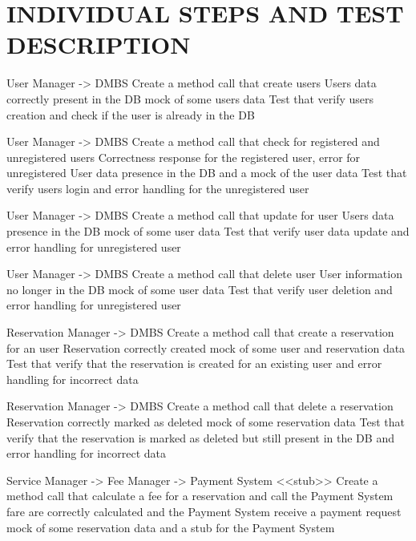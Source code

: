 \section{INDIVIDUAL STEPS AND TEST DESCRIPTION}

\teststep 
{User Manager -> DMBS}
{Create a method call that create users }
{Users data correctly present in the DB}
{mock of some users data }
{Test that verify users creation and check if the user is already in the DB}

\teststep 
{User Manager -> DMBS}
{Create a method call that check for registered and unregistered users}
{Correctness response for the registered user, error for unregistered}
{User data presence in the DB and a mock of  the user data }
{Test that verify users login and error handling for the unregistered user}

\teststep 
{User Manager -> DMBS}
{Create a method call that update for user }
{Users data presence in the DB}
{mock of some user data }
{Test that verify user data update and error handling for unregistered user}

\teststep 
{User Manager -> DMBS}
{Create a method call that delete user }
{User information no longer in the DB}
{mock of some user data }
{Test that verify user deletion and error handling for unregistered user}

\newpage


\newpage

\teststep 
{Reservation Manager -> DMBS}
{Create a method call that create a reservation for an user }
{Reservation correctly created}
{mock of some user and reservation data }
{Test that verify that the reservation is created for an existing user and error handling for incorrect data }

\teststep 
{Reservation Manager -> DMBS}
{Create a method call that delete a reservation  }
{Reservation correctly marked as deleted}
{mock of some reservation data }
{Test that verify that the reservation is marked as deleted but still present in the DB and error handling for incorrect data }


\newpage

\teststep 
{Service Manager -> Fee Manager -> Payment System <<stub>>}
{Create a method call that calculate a fee for  a reservation and call the Payment System }
{fare are correctly calculated and the Payment System receive a payment request}
{mock of some reservation data and a stub for the Payment System }
{}



